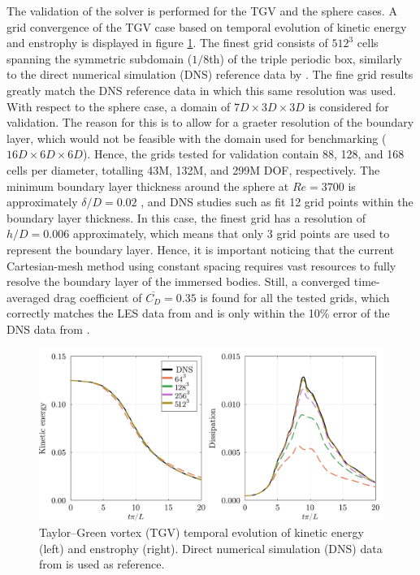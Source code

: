 \documentclass[final,3p,times]{elsarticle}
\begin{document}
The validation of the solver is performed for the TGV and the sphere cases. A grid convergence of the TGV case based on temporal evolution of kinetic energy and enstrophy is displayed in figure \ref{fig:tgv_val}. The finest grid consists of $512^3$ cells spanning the symmetric subdomain ($1/8$th) of the triple periodic box, similarly to the direct numerical simulation (DNS) reference data by \cite{Dairay2017}. The fine grid results greatly match the DNS reference data in which this same resolution was used. With respect to the sphere case, a domain of $7D\times3D\times3D$ is considered for validation. The reason for this is to allow for a graeter resolution of the boundary layer, which would not be feasible with the domain used for benchmarking ($16D\times6D\times6D$). Hence, the grids tested for validation contain 88, 128, and 168 cells per diameter, totalling 43M, 132M, and 299M DOF, respectively. The minimum boundary layer thickness around the sphere at $Re=3700$ is approximately $\delta/D=0.02$ \citep{Capuano2023}, and DNS studies such as \cite{Rodriguez2011} fit 12 grid points within the boundary layer thickness. In this case, the finest grid has a resolution of $h/D=0.006$ approximately, which means that only 3 grid points are used to represent the boundary layer. Hence, it is important noticing that the current Cartesian-mesh method using constant spacing requires vast resources to fully resolve the boundary layer of the immersed bodies. Still, a converged time-averaged drag coefficient of $\overline{C_D}=0.35$ is found for all the tested grids, which correctly matches the LES data from \cite{Yun2006} and is only within the 10\% error of the DNS data from \cite{Rodriguez2011}.

\begin{figure}[!ht]
    \centering
    \includegraphics[width=0.8\linewidth]{img/tgv.pdf}
	\caption{Taylor--Green vortex (TGV) temporal evolution of kinetic energy (left) and enstrophy (right). Direct numerical simulation (DNS) data from \cite{Dairay2017} is used as reference.}
	\label{fig:tgv_val}
\end{figure}
\end{document}
